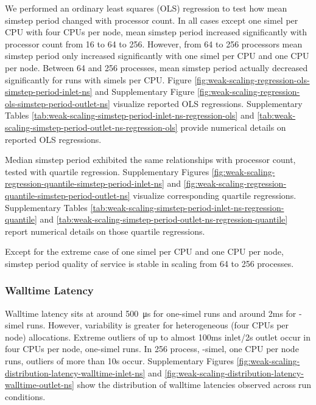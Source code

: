 

We performed an ordinary least squares (OLS) regression to test how mean simstep period changed with processor count.
In all cases except one simel per CPU with four CPUs per node, mean simstep period increased significantly with processor count from 16 to 64 to 256.
However, from 64 to 256 processors mean simstep period only increased significantly with one simel per CPU and one CPU per node.
Between 64 and 256 processes, mean simstep period actually decreased significantly for runs with  simels per CPU.
Figure \ref{fig:weak-scaling-regression-ols-simstep-period-inlet-ns} and Supplementary Figure \ref{fig:weak-scaling-regression-ols-simstep-period-outlet-ns} visualize reported OLS regressions.
Supplementary Tables \ref{tab:weak-scaling-simstep-period-inlet-ns-regression-ols} and \ref{tab:weak-scaling-simstep-period-outlet-ns-regression-ols} provide numerical details on reported OLS regressions.

Median simstep period exhibited the same relationships with processor count, tested with quartile regression.
Supplementary Figures \ref{fig:weak-scaling-regression-quantile-simstep-period-inlet-ns} and \ref{fig:weak-scaling-regression-quantile-simstep-period-outlet-ns} visualize corresponding quartile regressions.
Supplementary Tables \ref{tab:weak-scaling-simstep-period-inlet-ns-regression-quantile} and \ref{tab:weak-scaling-simstep-period-outlet-ns-regression-quantile} report numerical details on those quartile regressions.

Except for the extreme case of one simel per CPU and one CPU per node, simstep period quality of service is stable in scaling from 64 to 256 processes.

\subsubsection{Walltime Latency}

Walltime latency sits at around \SI{500}{\micro\second} for one-simel runs and around 2ms for -simel runs.
However, variability is greater for heterogeneous (four CPUs per node) allocations.
Extreme outliers of up to almost 100ms inlet/2s outlet occur in four CPUs per node, one-simel runs.
In 256 process, -simel, one CPU per node runs, outliers of more than 10s occur.
Supplementary Figures \ref{fig:weak-scaling-distribution-latency-walltime-inlet-ns} and \ref{fig:weak-scaling-distribution-latency-walltime-outlet-ns} show the distribution of walltime latencies observed across run conditions.

